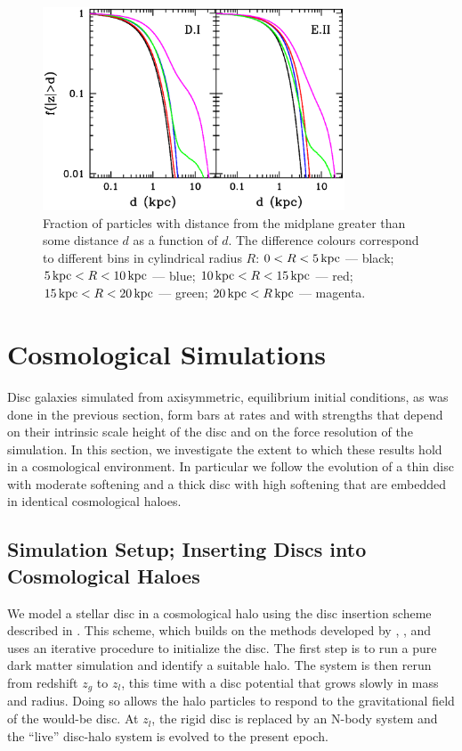\begin{figure}
	\centering
	\includegraphics[width=0.8\textwidth]{../figures/kicked_up_disk.eps}
	\caption{Fraction of particles with distance from the midplane greater
than some distance $d$ as a function of $d$.  The difference colours correspond to
different bins in cylindrical radius $R$: $0<R<5\,{\rm kpc}$ --- black;
$5\,{\rm kpc} < R < 10\,{\rm kpc}$ --- blue;
$10\,{\rm kpc} < R < 15\,{\rm kpc}$ --- red;
$15\,{\rm kpc} < R < 20\,{\rm kpc}$ --- green;
$20\,{\rm kpc} < R\,{\rm kpc}$ --- magenta.}
 \label{fig:kicked_up_disc}
\end{figure}

\section{Cosmological Simulations} \label{sec:cosmo}

Disc galaxies simulated from axisymmetric, equilibrium initial
conditions, as was done in the previous section, form bars at rates
and with strengths that depend on their intrinsic scale height of the
disc and on the force resolution of the simulation. In this section,
we investigate the extent to which these results hold in a
cosmological environment.  In particular we follow the evolution of a
thin disc with moderate softening and a thick disc with high softening
that are embedded in identical cosmological haloes.

\subsection{Simulation Setup; Inserting Discs into Cosmological Haloes}

We model a stellar disc in a cosmological halo using the disc
insertion scheme described in \citet{Bauer2018a}.  This scheme, which
builds on the methods developed by
\citet{BerentzenShlosmanStellarDisks}, \citet{DeBuhrStellarDisks}, and
\citet{YurinSpringelStellarDisks} uses an iterative procedure to
initialize the disc.  The first step is to run a pure dark matter
simulation and identify a suitable halo.  The system is then rerun
from redshift $z_g$ to $z_l$, this time with a disc potential that
grows slowly in mass and radius.  Doing so allows the halo particles
to respond to the gravitational field of the would-be disc.  At $z_l$,
the rigid disc is replaced by an N-body system and the ``live'' disc-halo
system is evolved to the present epoch.

